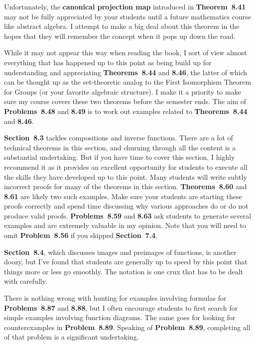 \documentclass[11pt]{article}%
\newcommand{\blankline}{\pagebreak[2]\vspace{.5\baselineskip}}
\begin{document}
\blankline

Unfortunately, the \textbf{canonical projection map} introduced in \textbf{Theorem~8.41} may not be fully appreciated by your students until a future mathematics course like abstract algebra. I attempt to make a big deal about this theorem in the hopes that they will remember the concept when it pops up down the road.

\blankline

While it may not appear this way when reading the book, I sort of view almost everything that has happened up to this point as being build up for understanding and appreciating \textbf{Theorems~8.44} and \textbf{8.46}, the latter of which can be thought up as the set-theoretic analog to the First Isomorphism Theorem for Groups (or your favorite algebraic structure). I make it a priority to make sure my course covers these two theorems before the semester ends.  The aim of \textbf{Problems~8.48} and \textbf{8.49} is to work out examples related to \textbf{Theorems~8.44} and \textbf{8.46}.

\blankline

\textbf{Section~8.3} tackles compositions and inverse functions. There are a lot of technical theorems in this section, and churning through all the content is a substantial undertaking.  But if you have time to cover this section, I highly recommend it as it provides an excellent opportunity for students to execute all the skills they have developed up to this point.  Many students will write subtly incorrect proofs for many of the theorems in this section. \textbf{Theorems~8.60} and \textbf{8.61} are likely two such examples. Make sure your students are starting these proofs correctly and spend time discussing why various approaches do or do not produce valid proofs. \textbf{Problems~8.59} and \textbf{8.63} ask students to generate several examples and are extremely valuable in my opinion. Note that you will need to omit \textbf{Problem~8.56} if you skipped \textbf{Section~7.4}.  

\blankline

\textbf{Section~8.4}, which discusses images and preimages of functions, is another doozy, but I've found that students are generally up to speed by this point that things more or less go smoothly.  The notation is one crux that has to be dealt with carefully.  

\blankline

There is nothing wrong with hunting for examples involving formulas for \textbf{Problems~8.87} and \textbf{8.88}, but I often encourage students to first search for simple examples involving function diagrams. The same goes for looking for counterexamples in \textbf{Problem~8.89}.  Speaking of \textbf{Problem~8.89}, completing all of that problem is a significant undertaking.
\end{document}
